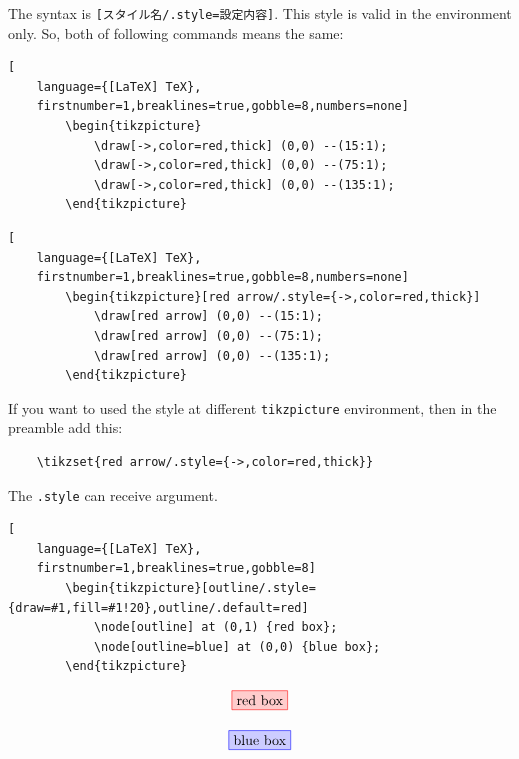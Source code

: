 \documentclass[lualatex]{jlreq}
\begin{document}
The syntax is \verb|[スタイル名/.style=設定内容]|. This style is valid in the environment only. So, both of following commands means the same:
\\[1em]
\begin{minipage}{0.48 \textwidth}
    \begin{lstlisting}[
    language={[LaTeX] TeX},
    firstnumber=1,breaklines=true,gobble=8,numbers=none]
        \begin{tikzpicture}
            \draw[->,color=red,thick] (0,0) --(15:1);
            \draw[->,color=red,thick] (0,0) --(75:1);
            \draw[->,color=red,thick] (0,0) --(135:1);
        \end{tikzpicture}
    \end{lstlisting}
\end{minipage}
\hfill
\begin{minipage}{0.48 \textwidth}
    \begin{lstlisting}[
    language={[LaTeX] TeX},
    firstnumber=1,breaklines=true,gobble=8,numbers=none]
        \begin{tikzpicture}[red arrow/.style={->,color=red,thick}]
            \draw[red arrow] (0,0) --(15:1);
            \draw[red arrow] (0,0) --(75:1);
            \draw[red arrow] (0,0) --(135:1);
        \end{tikzpicture}
    \end{lstlisting}
\end{minipage}

If you want to used the style at different \verb|tikzpicture| environment, then in the preamble add this:
\begin{verbatim}
    \tikzset{red arrow/.style={->,color=red,thick}}
\end{verbatim}

The \verb|.style| can receive argument.
\\[1em]
\begin{minipage}{0.78 \textwidth}
    \begin{lstlisting}[
    language={[LaTeX] TeX},
    firstnumber=1,breaklines=true,gobble=8]
        \begin{tikzpicture}[outline/.style={draw=#1,fill=#1!20},outline/.default=red]
            \node[outline] at (0,1) {red box};
            \node[outline=blue] at (0,0) {blue box};
        \end{tikzpicture}
    \end{lstlisting}
\end{minipage}
\hfill
\begin{minipage}{0.18 \textwidth}
    \[
        \begin{tikzpicture}[outline/.style={draw=#1,fill=#1!20},outline/.default=red]
            \node[outline] at (0,1) {red box};
            \node[outline=blue] at (0,0) {blue box};
        \end{tikzpicture}
    \]
\end{minipage}
\\[1em]
\end{document}
